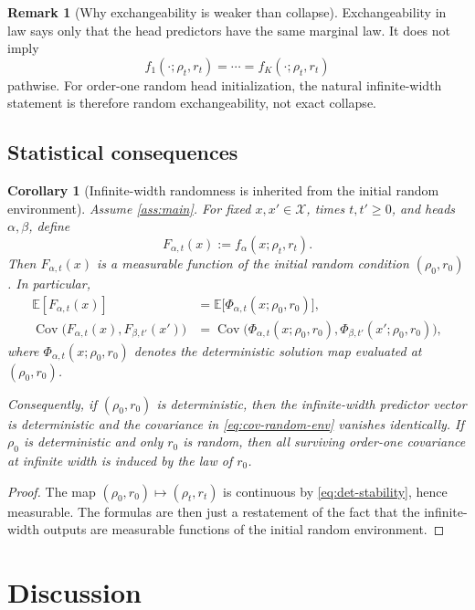 \documentclass[11pt]{article}
\newtheorem{corollary}[theorem]{Corollary}
\theoremstyle{definition}
\newtheorem{remark}[theorem]{Remark}
\newcommand{\E}{\mathbb{E}}
\begin{document}
\begin{remark}[Why exchangeability is weaker than collapse]
Exchangeability in law says only that the head predictors have the same marginal law. It does not imply
\[
  f_1(\cdot;\rho_t,r_t)=\cdots=f_K(\cdot;\rho_t,r_t)
\]
pathwise. For order-one random head initialization, the natural infinite-width statement is therefore random exchangeability, not exact collapse.
\end{remark}

\subsection{Statistical consequences}

\begin{corollary}[Infinite-width randomness is inherited from the initial random environment]
\label{cor:cov}
Assume \cref{ass:main}. For fixed $x,x'\in\mathcal X$, times $t,t'\ge 0$, and heads $\alpha,\beta$, define
\[
  F_{\alpha,t}(x)
  :=
  f_\alpha(x;\rho_t,r_t).
\]
Then $F_{\alpha,t}(x)$ is a measurable function of the initial random condition $(\rho_0,r_0)$. In particular,
\begin{align}
  \E[F_{\alpha,t}(x)]
  &=
  \E\bigl[
    \Phi_{\alpha,t}(x;\rho_0,r_0)
  \bigr],
  \label{eq:mean-random-env}
  \\
  \operatorname{Cov}\bigl(F_{\alpha,t}(x),F_{\beta,t'}(x')\bigr)
  &=
  \operatorname{Cov}\bigl(
    \Phi_{\alpha,t}(x;\rho_0,r_0),
    \Phi_{\beta,t'}(x';\rho_0,r_0)
  \bigr),
  \label{eq:cov-random-env}
\end{align}
where $\Phi_{\alpha,t}(x;\rho_0,r_0)$ denotes the deterministic solution map evaluated at $(\rho_0,r_0)$.

Consequently, if $(\rho_0,r_0)$ is deterministic, then the infinite-width predictor vector is deterministic and the covariance in \eqref{eq:cov-random-env} vanishes identically. If $\rho_0$ is deterministic and only $r_0$ is random, then all surviving order-one covariance at infinite width is induced by the law of $r_0$.
\end{corollary}

\begin{proof}
The map $(\rho_0,r_0)\mapsto(\rho_t,r_t)$ is continuous by \eqref{eq:det-stability}, hence measurable. The formulas are then just a restatement of the fact that the infinite-width outputs are measurable functions of the initial random environment.
\end{proof}

\section{Discussion}
\end{document}
